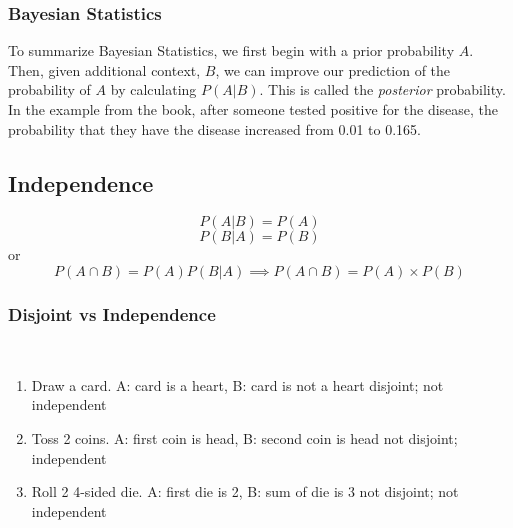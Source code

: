             \subsubsection{Bayesian Statistics}  %
                To summarize Bayesian Statistics, we first begin with a prior probability $A$. Then, given additional context, $B$, we can improve our prediction of the probability of $A$ by calculating $P(A\vert B)$. This is called the \emph{posterior} probability. In the example from the book, after someone tested positive for the disease, the probability that they have the disease increased from 0.01 to 0.165.
        \subsection{Independence}  %
            \begin{equation} P(A\vert B)=P(A) \end{equation}
            \begin{equation} P(B\vert A)=P(B) \end{equation}
            or
            \begin{equation} P(A\cap B)=P(A)P(B\vert A)\implies P(A\cap B)=P(A)\times P(B) \end{equation}
            \subsubsection{Disjoint vs Independence}  %
                 \\
                \begin{enumerate}
                    \item Draw a card. A: card is a heart, B: card is not a heart
                    \subitem disjoint; not independent
                    \item Toss 2 coins. A: first coin is head, B: second coin is head
                    \subitem not disjoint; independent
                    \item Roll 2 4-sided die. A: first die is 2, B: sum of die is 3
                    \subitem not disjoint; not independent
                \end{enumerate}
